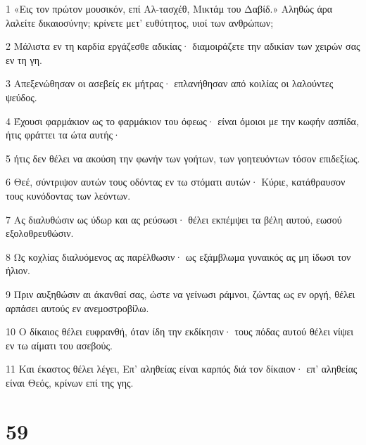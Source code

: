 \par 1 «Εις τον πρώτον μουσικόν, επί Αλ-τασχέθ, Μικτάμ του Δαβίδ.» Αληθώς άρα λαλείτε δικαιοσύνην; κρίνετε μετ' ευθύτητος, υιοί των ανθρώπων;
\par 2 Μάλιστα εν τη καρδία εργάζεσθε αδικίας· διαμοιράζετε την αδικίαν των χειρών σας εν τη γη.
\par 3 Απεξενώθησαν οι ασεβείς εκ μήτρας· επλανήθησαν από κοιλίας οι λαλούντες ψεύδος.
\par 4 Έχουσι φαρμάκιον ως το φαρμάκιον του όφεως· είναι όμοιοι με την κωφήν ασπίδα, ήτις φράττει τα ώτα αυτής·
\par 5 ήτις δεν θέλει να ακούση την φωνήν των γοήτων, των γοητευόντων τόσον επιδεξίως.
\par 6 Θεέ, σύντριψον αυτών τους οδόντας εν τω στόματι αυτών· Κύριε, κατάθραυσον τους κυνόδοντας των λεόντων.
\par 7 Ας διαλυθώσιν ως ύδωρ και ας ρεύσωσι· θέλει εκπέμψει τα βέλη αυτού, εωσού εξολοθρευθώσιν.
\par 8 Ως κοχλίας διαλυόμενος ας παρέλθωσιν· ως εξάμβλωμα γυναικός ας μη ίδωσι τον ήλιον.
\par 9 Πριν αυξηθώσιν αι άκανθαί σας, ώστε να γείνωσι ράμνοι, ζώντας ως εν οργή, θέλει αρπάσει αυτούς εν ανεμοστροβίλω.
\par 10 Ο δίκαιος θέλει ευφρανθή, όταν ίδη την εκδίκησιν· τους πόδας αυτού θέλει νίψει εν τω αίματι του ασεβούς.
\par 11 Και έκαστος θέλει λέγει, Επ' αληθείας είναι καρπός διά τον δίκαιον· επ' αληθείας είναι Θεός, κρίνων επί της γης.

\chapter{59}

